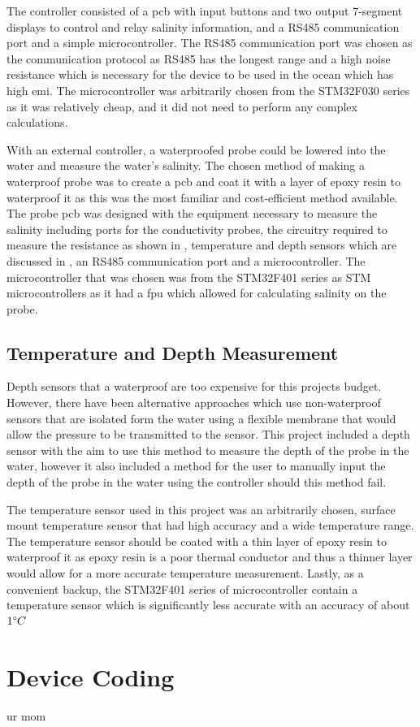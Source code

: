 The controller consisted of a \gls{pcb} with input buttons and two output 7-segment displays to control and relay salinity information, and a RS485 communication port and a simple microcontroller.
The RS485 communication port was chosen as the communication protocol as RS485 has the longest range and a high noise resistance which is necessary for the device to be used in the ocean which has high \gls{emi}.
The microcontroller was arbitrarily chosen from the STM32F030 series as it was relatively cheap, and it did not need to perform any complex calculations.

With an external controller, a waterproofed probe could be lowered into the water and measure the water's salinity.
The chosen method of making a waterproof probe was to create a \gls{pcb} and coat it with a layer of epoxy resin to waterproof it as this was the most familiar and cost-efficient method available.
The probe \gls{pcb} was designed with the equipment necessary to measure the salinity including ports for the conductivity probes, the circuitry required to measure the resistance as shown in , temperature and depth sensors which are discussed in , an RS485 communication port and a microcontroller.
The microcontroller that was chosen was from the STM32F401 series as STM microcontrollers as it had a \gls{fpu} which allowed for calculating salinity on the probe. 

\subsection{Temperature and Depth Measurement}\label{sec:temp-depth-measurement}

Depth sensors that a waterproof are too expensive for this projects budget.
However, there have been alternative approaches which use non-waterproof sensors that are isolated form the water using a flexible membrane that would allow the pressure to be transmitted to the sensor.
This project included a depth sensor with the aim to use this method to measure the depth of the probe in the water, however it also included a method for the user to manually input the depth of the probe in the water using the controller should this method fail.

The temperature sensor used in this project was an arbitrarily chosen, surface mount temperature sensor that had high accuracy and a wide temperature range.
The temperature sensor should be coated with a thin layer of epoxy resin to waterproof it as epoxy resin is a poor thermal conductor and thus a thinner layer would allow for a more accurate temperature measurement.
Lastly, as a convenient backup, the STM32F401 series of microcontroller contain a temperature sensor which is significantly less accurate with an accuracy of about $1\degree C$

\section{Device Coding}
ur mom

